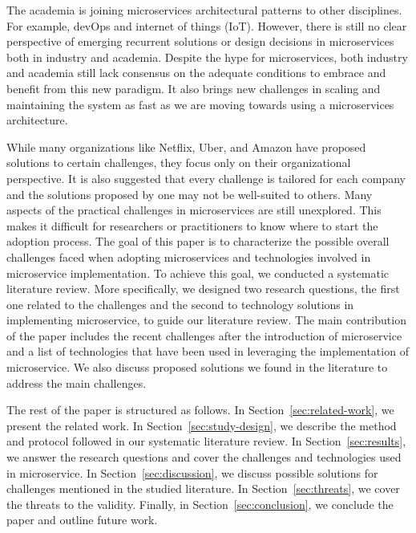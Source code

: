 The academia is joining microservices architectural patterns to other disciplines. For example, devOps and internet of things (IoT).\cite{Osses2019} However, there is still no clear perspective of emerging recurrent solutions or design decisions in microservices both in industry and academia.\cite{Soldani2018} Despite the hype for microservices, both industry and academia still lack consensus on the adequate conditions to embrace and benefit from this new paradigm.\cite{Dragoni2017} It also brings new challenges in scaling and maintaining the system as fast as we are moving towards using a microservices architecture.

While many organizations like Netflix,\cite{Meshenberg2016} Uber,\cite{Uber} and Amazon\cite{Amazon} have proposed solutions to certain challenges, they focus only on their organizational perspective. It is also suggested that every challenge is tailored for each company and the solutions proposed by one may not be well-suited to others.\cite{Kevin2015} Many aspects of the practical challenges in microservices are still unexplored. This makes it difficult for researchers or practitioners to know where to start the adoption process. The goal of this paper is to characterize the possible overall challenges faced when adopting microservices and technologies involved in microservice implementation. To achieve this goal, we conducted a systematic literature review.\cite{Kitchenham2007} More specifically, we designed two research questions, the first one related to the challenges and the second to technology solutions in implementing microservice, to guide our literature review. 
%
The main contribution of the paper includes the recent challenges after the introduction of microservice and a list of technologies that have been used in leveraging the implementation of microservice. We also discuss proposed solutions we found in the literature to address the main challenges.

The rest of the paper is structured as follows. In Section~\ref{sec:related-work}, we present the related work. In Section~\ref{sec:study-design}, we describe the method and protocol followed in our systematic literature review. In Section~\ref{sec:results}, we answer the research questions and cover the challenges and technologies used in microservice. In Section~\ref{sec:discussion}, we discuss possible solutions for challenges mentioned in the studied literature. In Section~\ref{sec:threats}, we cover the threats to the validity. Finally, in Section~\ref{sec:conclusion}, we conclude the paper and outline future work.



